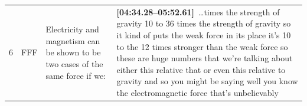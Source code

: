 \documentclass[10pt]{article}
\begin{document}
\begin{tiny}
\begin{longtable}{r p{0.3in} p{1.212in} p{3.8in}}
    6  &          FFF &                                                                                                                                                                                                  Electricity and magnetism can be shown to be two cases of the same force if we: &                                                                                                                                                                                                                                                                                                                                                                                                                                                                                                                                                                                                                                                                                                                                                                                                                                                                                                                                                                                                                                                                                                                                                                                                                                                                                                                                                                                                                                                                                                                                                                                                                                                                                                                                                                                                                                                                                                                                                                                                                                                                                                                                                                                                                                                                                                                                                                                                                                                                                                                                                                                                                                                                          \textbf{[04:34.28--05:52.61]}~\ldots times the strength of gravity 10 to 36 times the strength of gravity so it kind of puts the weak force in its place it's 10 to the 12 times stronger than the weak force so these are huge numbers that we're talking about either this relative that or even this relative to gravity and so you might be saying well you know the electromagnetic force that's unbelievably 
\end{longtable}
\end{tiny}
\end{document}
